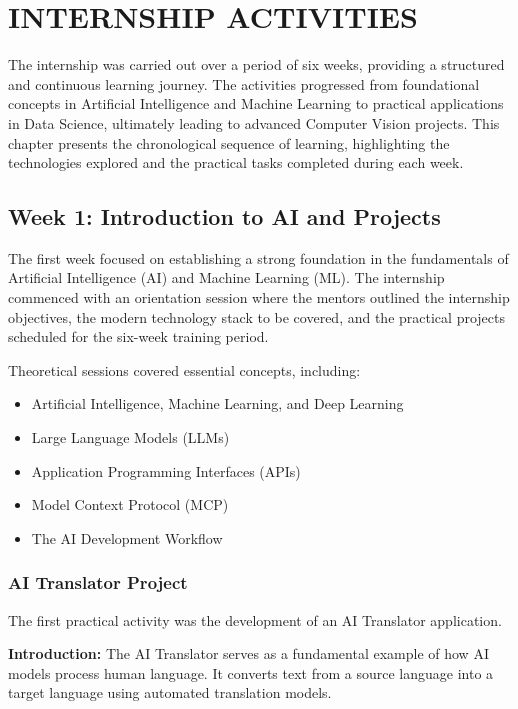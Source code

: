 \chapter{INTERNSHIP ACTIVITIES}

The internship was carried out over a period of six weeks, providing a structured and continuous learning journey. The activities progressed from foundational concepts in Artificial Intelligence and Machine Learning to practical applications in Data Science, ultimately leading to advanced Computer Vision projects. This chapter presents the chronological sequence of learning, highlighting the technologies explored and the practical tasks completed during each week.

\section{Week 1: Introduction to AI and Projects}

The first week focused on establishing a strong foundation in the fundamentals of Artificial Intelligence (AI) and Machine Learning (ML). The internship commenced with an orientation session where the mentors outlined the internship objectives, the modern technology stack to be covered, and the practical projects scheduled for the six-week training period.

Theoretical sessions covered essential concepts, including:
\begin{itemize}[leftmargin=1.5cm]
    \item Artificial Intelligence, Machine Learning, and Deep Learning
    \item Large Language Models (LLMs)
    \item Application Programming Interfaces (APIs)
    \item Model Context Protocol (MCP)
    \item The AI Development Workflow
\end{itemize}

\subsection{AI Translator Project}

The first practical activity was the development of an AI Translator application. 

\textbf{Introduction:} The AI Translator serves as a fundamental example of how AI models process human language. It converts text from a source language into a target language using automated translation models.

